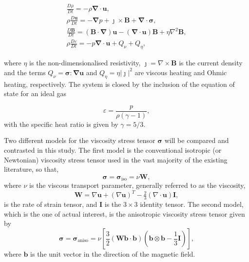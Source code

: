 \documentclass[fleqn,usenatbib]{mnras}
\newcommand{\ten}[1]{{\bm #1}}
\renewcommand{\vec}[1]{{\bm #1}}
\begin{document}
\begin{subequations}
  \label{eq:MHD}
  \begin{gather}
\label{eq:mhda}
\frac{D\rho}{Dt} = - \rho \vec{\nabla} \cdot \vec{u},\\
\rho\frac{D\vec{u}}{Dt} = -\vec{\nabla} p + \vec{\jmath} \times \vec{B} + \vec{\nabla} \cdot \ten{\sigma},\\
\frac{D\vec{B}}{Dt} = (\vec{B} \cdot \vec{\nabla})\vec{u} - (\vec{\nabla} \cdot \vec{u})\vec{B} + \eta \nabla^2 \vec{B},\\
\rho\frac{D\varepsilon}{Dt} = -p \vec{\nabla} \cdot \vec{u} + {Q}_{\nu} + {Q}_{\eta},%
    \end{gather}
\end{subequations}

where $\eta$ is the non-dimensionalised resistivity,
$\vec{\jmath} = \nabla \times \vec{B}$ is the current
density and the terms ${Q}_{\nu} = \ten{\sigma} : \vec{\nabla}\vec{u}$
  and ${Q}_{\eta} = \eta | \vec{\jmath} |^2$ are viscous heating and
  Ohmic heating, respectively. The system is closed by the inclusion
  of the equation of state for an ideal gas 

\begin{equation}
\varepsilon = \frac{p}{\rho(\gamma - 1)},
\end{equation}
with the specific heat ratio is given by $\gamma = 5/3$.

Two different models for the viscosity stress tensor $\ten{\sigma}$
will be compared and contrasted in this study. The first model is the
conventional isotropic (or Newtonian) viscosity stress tensor used in
the vast majority of the existing literature, so that, 
\begin{equation}
  \label{eq:isotropic_viscous_tensor}
\ten{\sigma = }\ten{\sigma}_{\text{iso}} = \nu \ten{W},
\end{equation}
where $\nu$ is the viscous transport parameter, generally referred to as the viscosity,
\begin{equation}
  \label{eq:rate_of_strain}
  \ten{W} = \nabla\vec{u} + (\nabla\vec{u})^T - \tfrac{2}{3}(\nabla \cdot \vec{u})\ten{I},
\end{equation}
is the rate of strain tensor, and $\ten{I}$ is the  $3\times 3$
identity tensor. The second model, which is the one of actual interest, is the anisotropic viscosity stress
tensor given by
\begin{equation}
  \label{eq:switching_model}
\ten{\sigma} = \ten{\sigma}_\text{aniso} = \nu \left[\frac{3}{2}(\ten{W}\vec{b}\cdot\vec{b}) \left( \vec{b} \otimes \vec{b} - \frac{1}{3}\ten{I} \right)\right],
\end{equation}
where $\vec{b}$ is the unit vector in the direction of the magnetic
field.
\end{document}
